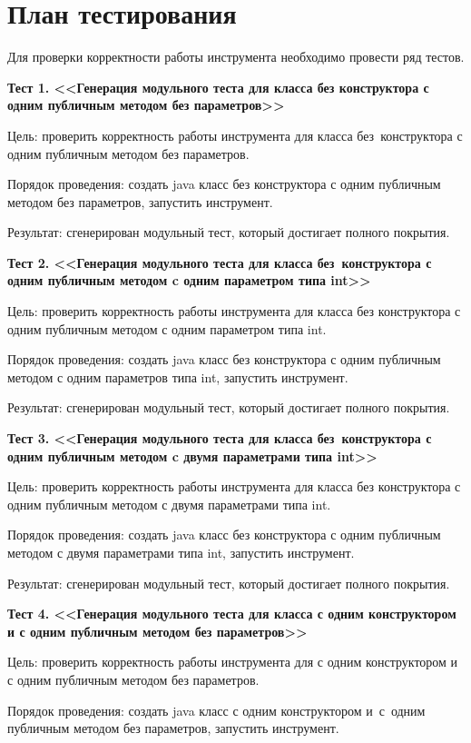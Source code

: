 \section{План тестирования} \label{sub26}

Для проверки корректности работы инструмента необходимо провести ряд тестов.

\textbf{Тест 1. <<Генерация модульного теста для класса без конструктора с одним публичным методом без параметров>>}

Цель: проверить корректность работы инструмента  для класса без~конструктора с одним публичным методом без параметров.

Порядок проведения: создать java класс без конструктора с одним публичным методом без параметров, запустить инструмент.

Результат: сгенерирован модульный тест, который достигает полного покрытия.


\textbf{Тест 2. <<Генерация модульного теста для класса без~конструктора с одним публичным методом c одним параметром типа int>>}

Цель: проверить корректность работы инструмента  для класса без конструктора с одним публичным методом с одним параметром типа int.

Порядок проведения: создать java класс без конструктора с одним публичным методом с одним параметров типа int, запустить инструмент.

Результат: сгенерирован модульный тест, который достигает полного покрытия.


\textbf{Тест 3. <<Генерация модульного теста для класса без~конструктора с одним публичным методом c двумя параметрами типа int>>}

Цель: проверить корректность работы инструмента  для класса без конструктора с одним публичным методом с двумя параметрами типа int.

Порядок проведения: создать java класс без конструктора с одним публичным методом с двумя параметрами типа int, запустить инструмент.

Результат: сгенерирован модульный тест, который достигает полного покрытия.

\textbf{Тест 4. <<Генерация модульного теста для класса с одним конструктором и с одним публичным методом без параметров>>}

Цель: проверить корректность работы инструмента для с одним конструктором и с одним публичным методом без параметров.

Порядок проведения: создать java класс с одним конструктором и~с~одним публичным методом без параметров, запустить инструмент.

